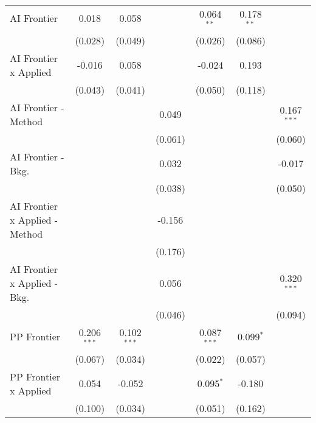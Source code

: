 \begin{tabular}{lcccccc}
   AI Frontier                    & 0.018         & 0.058         &               & 0.064$^{**}$  & 0.178$^{**}$ &   \\   
                                  & (0.028)       & (0.049)       &               & (0.026)       & (0.086)      &   \\   
   AI Frontier x Applied          & -0.016        & 0.058         &               & -0.024        & 0.193        &   \\   
                                  & (0.043)       & (0.041)       &               & (0.050)       & (0.118)      &   \\   
   AI Frontier - Method           &               &               & 0.049         &               &              & 0.167$^{***}$\\   
                                  &               &               & (0.061)       &               &              & (0.060)\\   
   AI Frontier - Bkg.             &               &               & 0.032         &               &              & -0.017\\   
                                  &               &               & (0.038)       &               &              & (0.050)\\   
   AI Frontier x Applied - Method &               &               & -0.156        &               &              &   \\   
                                  &               &               & (0.176)       &               &              &   \\   
   AI Frontier x Applied - Bkg.   &               &               & 0.056         &               &              & 0.320$^{***}$\\   
                                  &               &               & (0.046)       &               &              & (0.094)\\   
   PP Frontier                    & 0.206$^{***}$ & 0.102$^{***}$ &               & 0.087$^{***}$ & 0.099$^{*}$  &   \\   
                                  & (0.067)       & (0.034)       &               & (0.022)       & (0.057)      &   \\   
   PP Frontier x Applied          & 0.054         & -0.052        &               & 0.095$^{*}$   & -0.180       &   \\   
                                  & (0.100)       & (0.034)       &               & (0.051)       & (0.162)      &   \\   

\end{tabular}
